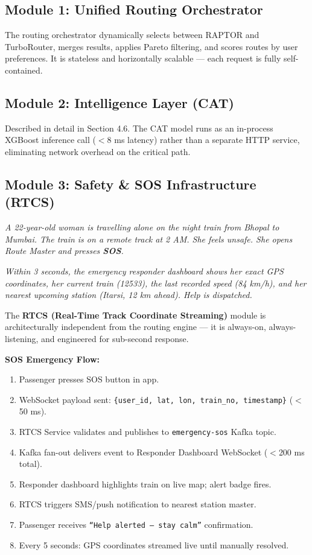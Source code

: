 \documentclass[12pt,a4paper]{report}
\begin{document}
\subsection{Module 1: Unified Routing Orchestrator}

The routing orchestrator dynamically selects between RAPTOR and TurboRouter, merges results, applies Pareto filtering, and scores routes by user preferences. It is stateless and horizontally scalable --- each request is fully self-contained.

\subsection{Module 2: Intelligence Layer (CAT)}

Described in detail in Section 4.6. The CAT model runs as an in-process XGBoost inference call ($<$8 ms latency) rather than a separate HTTP service, eliminating network overhead on the critical path.

\subsection{Module 3: Safety \& SOS Infrastructure (RTCS)}

\begin{tcolorbox}[storybox]
\textit{A 22-year-old woman is travelling alone on the night train from Bhopal to Mumbai. The train is on a remote track at 2 AM. She feels unsafe. She opens Route Master and presses \textbf{SOS}.}

\textit{Within 3 seconds, the emergency responder dashboard shows her exact GPS coordinates, her current train (12533), the last recorded speed (84 km/h), and her nearest upcoming station (Itarsi, 12 km ahead). Help is dispatched.}
\end{tcolorbox}

The \textbf{RTCS (Real-Time Track Coordinate Streaming)} module is architecturally independent from the routing engine --- it is always-on, always-listening, and engineered for sub-second response.

\textbf{SOS Emergency Flow:}

\begin{enumerate}[leftmargin=1.5em]
  \item Passenger presses SOS button in app.
  \item WebSocket payload sent: \texttt{\{user\_id, lat, lon, train\_no, timestamp\}} ($<$50 ms).
  \item RTCS Service validates and publishes to \texttt{emergency-sos} Kafka topic.
  \item Kafka fan-out delivers event to Responder Dashboard WebSocket ($<$200 ms total).
  \item Responder dashboard highlights train on live map; alert badge fires.
  \item RTCS triggers SMS/push notification to nearest station master.
  \item Passenger receives \texttt{``Help alerted --- stay calm''} confirmation.
  \item Every 5 seconds: GPS coordinates streamed live until manually resolved.
\end{enumerate}
\end{document}
